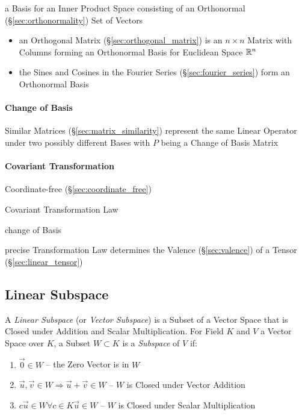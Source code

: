 a Basis for an Inner Product Space consisting of an Orthonormal
(\S\ref{sec:orthonormality}) Set of Vectors

\begin{itemize}
  \item an Orthogonal Matrix (\S\ref{sec:orthogonal_matrix}) is an $n \times n$
    Matrix with Columns forming an Orthonormal Basis for Euclidean Space
    $\mathbb{R}^n$
  \item the Sines and Cosines in the Fourier Series
    (\S\ref{sec:fourier_series}) form an Orthonormal Basis
\end{itemize}



\paragraph{Change of Basis}\label{sec:change_of_basis}\hfill

Similar Matrices (\S\ref{sec:matrix_similarity}) represent the same Linear
Operator under two possibly different Bases with $P$ being a Change of Basis
Matrix



\paragraph{Covariant Transformation}\label{sec:covariant_transformation}\hfill

Coordinate-free (\S\ref{sec:coordinate_free})

Covariant Transformation Law

change of Basis

precise Transformation Law determines the Valence
(\S\ref{sec:valence}) of a Tensor (\S\ref{sec:linear_tensor})



\subsection{Linear Subspace}\label{sec:linear_subspace}

A \emph{Linear Subspace} (or \emph{Vector Subspace}) is a Subset of a Vector
Space that is Closed under Addition and Scalar Multiplication. For Field $K$
and $V$ a Vector Space over $K$, a Subset $W \subset K$ is a \emph{Subspace} of
$V$ if:
\begin{enumerate}
  \item $\vec{0} \in W$ -- the Zero Vector is in $W$
  \item $\vec{u}, \vec{v} \in W \Rightarrow \vec{u} + \vec{v} \in W$
    -- $W$ is Closed under Vector Addition
  \item $c\vec{u} \in W \forall c \in K \vec{u} \in W$
    -- $W$ is Closed under Scalar Multiplication
\end{enumerate}

